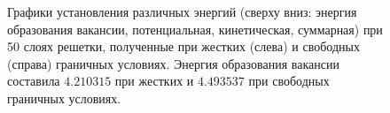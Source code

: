\documentclass[12pt,a4paper]{article}
\begin{document}
        \begin{figure}[!htb]%
            \centering
            \hspace{8pt}%
            \hspace{8pt}%
            \hspace{8pt}%
            \hspace{8pt}%
            \hspace{8pt}%
            \hspace{8pt}%
            \hspace{8pt}%
            \hspace{8pt}%
            \caption[]{Графики установления различных энергий (сверху вниз: энергия образования вакансии, потенциальная, кинетическая, суммарная) при 50 слоях решетки, полученные при жестких (слева) и свободных (справа) граничных условиях. Энергия образования вакансии составила $4.210315$ при жестких и $4.493537$ при свободных граничных условиях.}%
            \label{fig:2}%
        \end{figure}
\end{document}
